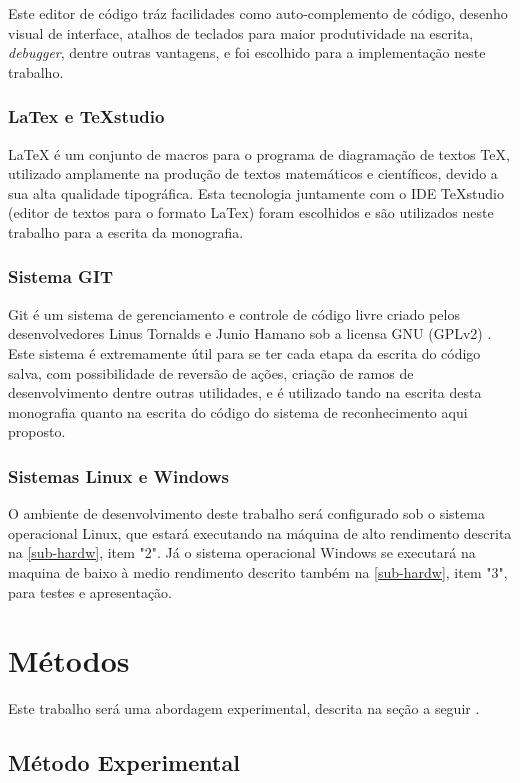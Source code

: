 Este editor de código tráz facilidades como auto-complemento de código, desenho visual de interface, atalhos de teclados para maior produtividade na escrita, \textit{debugger}, dentre outras vantagens, e foi escolhido para a implementação neste trabalho.

\subsubsection{LaTex e TeXstudio}\label{subsec:latex}
LaTeX é um conjunto de macros para o programa de diagramação de textos TeX, utilizado amplamente na produção de textos matemáticos e científicos, devido a sua alta qualidade tipográfica. Esta tecnologia juntamente com o IDE TeXstudio (editor de textos para o formato LaTex) foram escolhidos e são utilizados neste trabalho para a escrita da monografia.

\subsubsection{Sistema GIT}\label{subsec:git}
Git é um sistema de gerenciamento e controle de código livre criado pelos desenvolvedores Linus Tornalds e Junio Hamano sob a licensa GNU (GPLv2) \cite{git}. Este sistema é extremamente útil para se ter cada etapa da escrita do código salva, com possibilidade de reversão de ações, criação de ramos de desenvolvimento dentre outras utilidades, e é utilizado tando na escrita desta monografia quanto na escrita do código do sistema de reconhecimento aqui proposto.

\subsubsection{Sistemas Linux e Windows}\label{subsec:linux}
O ambiente de desenvolvimento deste trabalho será configurado sob o sistema operacional Linux, que estará executando na máquina de alto rendimento descrita na \autoref{sub-hardw}, item "2". Já o sistema operacional Windows se executará na maquina de baixo à medio rendimento descrito também na \autoref{sub-hardw}, item "3", para testes e apresentação.


\section{Métodos}\label{sec:metodos}
Este trabalho será uma abordagem experimental, descrita na seção a seguir \cite{fachin-metodos}.


\subsection{Método Experimental}\label{metex}

